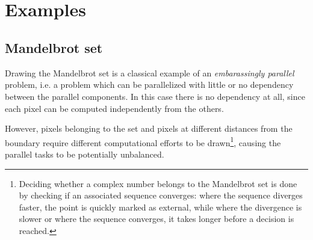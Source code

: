 
~\\~
\section{Examples} \label{sec:examples}
\enlargethispage{2\baselineskip} %



\subsection{Mandelbrot set}
Drawing the Mandelbrot set is a classical example of an \emph{embarassingly parallel} problem, i.e. a problem which can be parallelized with little or no dependency between the parallel components. In this case there is no dependency at all, since each pixel can be computed independently from the others.

However, pixels belonging to the set and pixels at different distances from the boundary require different computational efforts to be drawn\footnote{Deciding whether a complex number belongs to the Mandelbrot set is done by checking if an associated sequence converges: where the sequence diverges faster, the point is quickly marked as external, while where the divergence is slower or where the sequence converges, it takes longer before a decision is reached.}, causing the parallel tasks to be potentially unbalanced.

